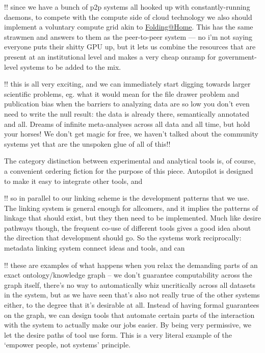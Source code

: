 \documentclass[notoc]{tufte-book}
\begin{document}
!! since we have a bunch of p2p systems all hooked up with
constantly-running daemons, to compete with the compute side of cloud
technology we also should implement a voluntary compute grid akin to
\href{https://foldingathome.org/}{Folding@Home}. This has the same
strawmen and answers to them as the peer-to-peer system --- no i'm not
saying everyone puts their shitty GPU up, but it lets us combine the
resources that are present at an institutional level and makes a very
cheap onramp for government-level systems to be added to the mix.

!! this is all very exciting, and we can immediately start digging
towards larger scientific problems, eg. what it would mean for the file
drawer problem and publication bias when the barriers to analyzing data
are so low you don't even need to write the null result: the data is
already there, semantically annotated and all. Dreams of infinite
meta-analyses across all data and all time, but hold your horses! We
don't get magic for free, we haven't talked about the community systems
yet that are the unspoken glue of all of this!!

The category distinction between experimental and analytical tools is,
of course, a convenient ordering fiction for the purpose of this piece.
Autopilot is designed to make it easy to integrate other tools, and \citep{kaneRealtimeLowlatencyClosedloop2020} 

!! so in parallel to our linking scheme is the development patterns that
we use. The linking system is general enough for allcomers, and it
implies the patterns of linkage that should exist, but they then need to
be implemented. Much like desire pathways though, the frequent co-use of
different tools gives a good idea about the direction that development
should go. So the systems work reciprocally: metadata linking system
connect ideas and tools, and can

!! these are examples of what happens when you relax the demanding parts
of an exact ontology/knowledge graph -- we don't guarantee computability
across the graph itself, there's no way to automatically whiz
uncritically across all datasets in the system, but as we have seen
that's also not really true of the other systems either, to the degree
that it's desirable at all. Instead of having formal guarantees on the
graph, we can design tools that automate certain parts of the
interaction with the system to actually make our jobs easier. By being
very permissive, we let the desire paths of tool use form. This is a
very literal example of the `empower people, not systems' principle.
\end{document}
